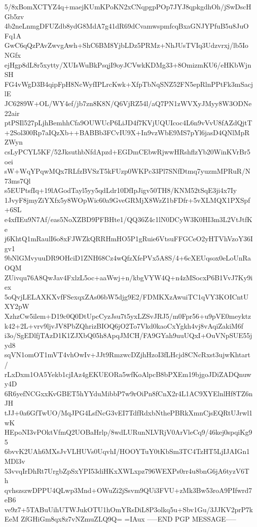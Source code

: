5/8xBomXCTYZ4q+maejKUmKPoKN2xCNqpgpPOp7JYJ8qpkgdhOh/jSwDscHGb5zv
4b2neLnmgDFUZdb8ydG8MdA7g41dR69dCvamwspmfcqBxaGNJYPfuB5u8JuOFq1A
GwC6qQzPAvZwvgAwh+ShC6BM8YjbLDz5PRMz+NhJUsTVIq3Udzvrxj/lb5IoNGfx
ejHgp8dL8r5xytty/XUIsWuBkPsqjI9oyJCVwkKDMg33+8OmizmKU6/eHKbWjnSH
FG4vWgD3B4qipFpH8NcWyfIPLrcKwk+XfpTbNqSNZ52FN5epRlnPPtFk3mSacjlE
JC6289W+OL/WY4ef/jb7zn8K8N/Q6VjRZ54l/aQ7PN1zWVXyJMyy8W3ODNe22air
ptPSIl527pLjhBemhhCfa9OUWUcP6LiJD4f7KVjUQUIcoc4L6n9vVvU8fAZdQjtT
+2Sol300Rp7aIQzXb++BABBb3FCvIU9X+In9vzWbE9MS7pYl6jasD4QNlMpRZWyn
csLyPCYL5KF/52JksuthbNfdApzd+EGDmCEbwRjwwHRshflzYb20WinKVrBr5oei
sW+WqYPqwMQx7RLfzBVSzT5kFUzp0WKPc33Pl7SNfDtmq7yuzmMPRuR/N73ms7Ql
s5EUPtsfIq+19lAGodTayl5yy5qdLdr10DfIpJigv50TH8/KNM52tSqE3ji4x7Iy
1JvyF8jmyZiYXfx5y8WOpWic60a9GveGRMjX8WzZ1bFDfr+5vXLMQX1PXSpf+6SL
e4xfIEu9N7Af/eas5NoXZBD9PFBHte1/QQ36Z4c1lN0DCyW3K0HI3m3L2VtJtfKe
j6KhtQ1mRaulI6o8xFJWZkQRRHmHO5P1gRuie6VtsuFFGCeO2yHTVhVzoY36Igv1
9bNlGMvyuuDR9OHciD1ZNH68Cz4wQfzXfePVx5A8S/4+6cXEUqsox0eLoUnRaOQM
ZUivqu76A8QwJav4FxlzL5oc+aaWwj+n/kbgVYW4Q+n4zMSocxP6B1VvJ7Ky9iex
5oQvjLELAXKXvfFSexqxZAs06bW5djg9E2/FDMKXzAwuiTC1qVY3KOICntUXY2pW
XzhzCw5ilem+D19c0Q0DtUpcCyzJsu7t5yxLZSvJRJ5/m0Fpr56+u9pVE0meyktz
k42+2L+vrv9ljvJV8PbZQhrizBIOQ6jO2To7Vkd0kaoCxYgkh4vj8vAqiZakiM6f
i3o/SgEDlfjTAzD1K1ZJXbQ05h8ApqJMCH/FA9GYah9uuUQxI+OuVNpSUE55jyd8
sqVN1omOT1mVT4vhOwIv+JJt9RmzwcDZjhHzoI3fLHcjd8CNcRxst3ujwKhtart/
rLxDxm1OA5Yekb1cjIAz4gEKUEORa5wfKoAlpcB8bPXEm19bjgoJDiZADQnuwy4D
6R6yefNCGxxKvGBET5hYYduMibbP7w9rOiPn8fCnX2r4L1AC9XYElnlHf8TZ6nJH
tJJ+0a6GfTwUO/MqJPG4LsfNcG3vEI7TdfRdxbNthePBRkXmnCjsEQRtUJrwl1wK
HEpoNI3vPOktVfmQ2UOBaHrlp/8wdLURunNLVRjV0ArVleCq9/46kej0spqiKg95
6bvvK2UAh6MXsJvVLHUVs0UqvhI/HOOYTuY0tKbSm3TC4TzHT5LjIJAIGn1MDl3v
53vvqIrDhRt7UrgbZpSxYPI53diHKxXWLxpz796WEXPs0rr4u8bnG6jA6tyzV6Th
qvhszszwDPPU4QLwp3Mnd+OWuZi2jSsvm9QUi3FVU+zMk3Bw53roA9PIfwrd7eB6
ve9z7+5TABuUihUTWJukOTU1hOmYRsDiL8P3olkq5u+Sbv1Gu/3JJKV2prP7kEeM
ZfGHiGm8qx8z7vNZmuZLQ9Q=
=IAux
-----END PGP MESSAGE-----
